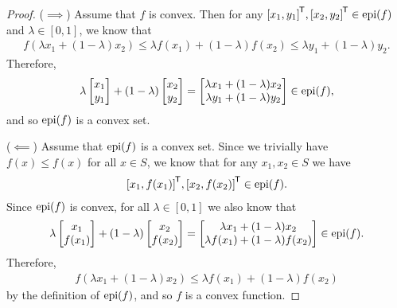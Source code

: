 \begin{proof}\proofbreak
    ($\implies$) Assume that $f$ is convex. Then for any ${[x_1, y_1]}^{\mkern-1.5mu\mathsf{T}}, {[x_2, y_2]}^{\mkern-1.5mu\mathsf{T}} \in \operatorname{epi}(f)$ and $\lambda \in [0, 1]$, we know that
    \begin{align*}
        f(\lambda x_1 + (1 - \lambda)x_2) \leq \lambda f(x_1) + (1 - \lambda)f(x_2) \leq \lambda y_1 + (1 - \lambda)y_2.
    \end{align*}
    Therefore,
    \begin{align*}
        \lambda \begin{bmatrix}
            x_1 \\ y_1
        \end{bmatrix} + (1-\lambda)\begin{bmatrix}
            x_2 \\ y_2
        \end{bmatrix} = \begin{bmatrix}
            \lambda x_1 + (1 - \lambda)x_2 \\
            \lambda y_1 + (1 - \lambda)y_2
        \end{bmatrix} \in \operatorname{epi}(f),
    \end{align*}
    and so $\operatorname{epi}(f)$ is a convex set.

    ($\impliedby$) Assume that $\operatorname{epi}(f)$ is a convex set. Since we trivially have $f(x) \leq f(x)$ for all $x \in S$, we know that for any $x_1, x_2 \in S$ we have
    \begin{align*}
        {[x_1, f(x_1)]}^{\mkern-1.5mu\mathsf{T}}, {[x_2, f(x_2)]}^{\mkern-1.5mu\mathsf{T}} \in \operatorname{epi}(f).
    \end{align*}
    Since $\operatorname{epi}(f)$ is convex, for all $\lambda \in [0, 1]$ we also know that
    \begin{align*}
        \lambda \begin{bmatrix}
            x_1 \\ f(x_1)
        \end{bmatrix} + (1-\lambda)\begin{bmatrix}
            x_2 \\ f(x_2)
        \end{bmatrix} = \begin{bmatrix}
            \lambda x_1 + (1 - \lambda)x_2 \\
            \lambda f(x_1) + (1 - \lambda)f(x_2)
        \end{bmatrix} \in \operatorname{epi}(f).
    \end{align*}
    Therefore,
    \begin{align*}
        f(\lambda x_1 + (1 - \lambda)x_2) \leq \lambda f(x_1) + (1-\lambda)f(x_2)
    \end{align*}
    by the definition of $\operatorname{epi}(f)$, and so $f$ is a convex function.
\end{proof}

